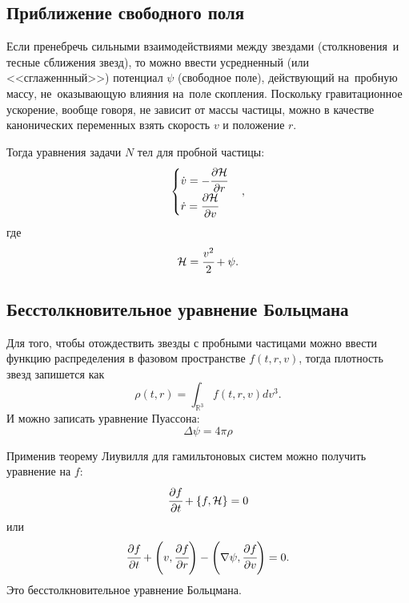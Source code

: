 \documentclass{beamer}
\begin{document}
\subsection{Приближение свободного поля}
\begin{frame}
    Если пренебречь сильными взаимодействиями между звездами (столкновения~и тесные сближения звезд), то можно ввести усредненный (или <<сглаженнный>>) потенциал $\psi$ (свободное поле), 
    действующий на~пробную массу, не~оказывающую влияния на~поле скопления. Поскольку гравитационное ускорение, вообще говоря, не зависит от массы частицы, можно в качестве канонических переменных взять скорость $v$ и положение $r$.
\end{frame}
\begin{frame}
    Тогда уравнения задачи $N$ тел для пробной частицы:
    \begin{equation*}
        \begin{cases}
            \dot{v} = -\cfrac{\partial \mathcal{H}}{\partial r}\\
            \dot{r} = \cfrac{\partial \mathcal{H} }{\partial v}
        \end{cases}, 
    \end{equation*}
    где
\begin{equation*}
    \mathcal{H} = \cfrac{v^2}{2} + \psi.
\end{equation*}
\end{frame}
\subsection{Бесстолкновительное уравнение Больцмана}
\begin{frame}
    Для того, чтобы отождествить звезды с пробными частицами можно ввести функцию распределения в фазовом пространстве $f(t, r, v)$, 
    тогда плотность звезд запишется как 
    \begin{equation*}
        \rho(t,r) = \int_{\mathbb{R} ^3} f(t,r,v) dv^3.
    \end{equation*}
    И можно записать уравнение Пуассона:
    \begin{equation*}
        \Delta \psi = 4\pi \rho
    \end{equation*}
\end{frame}
\begin{frame}
    Применив теорему Лиувилля для гамильтоновых систем можно получить уравнение на $f$:
    \begin{equation*}
        \cfrac{\partial f}{\partial t} + \left\{ f, \mathcal{H} \right\} = 0
    \end{equation*}
    или
    \begin{equation*}
        \cfrac{\partial f}{\partial t} + \left(v,\cfrac{\partial f}{\partial r}\right) - \left( \nabla \psi,\cfrac{\partial f}{\partial v}\right)  = 0.
    \end{equation*}
    Это бесстолкновительное уравнение Больцмана.
\end{frame}
\end{document}
